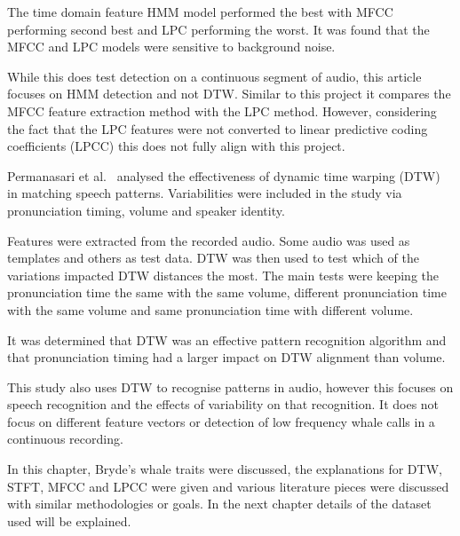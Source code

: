 The time domain feature \acs{HMM} model performed the best with \acs{MFCC} performing second best and 
\acs{LPC} performing the worst. It was found that the \acs{MFCC} and \acs{LPC} models were sensitive 
to background noise.

While this does test detection on a continuous segment of audio, this article focuses on 
\acs{HMM} detection and not \acs{DTW}. Similar to this project it compares the \acs{MFCC} feature extraction method with the \acs{LPC} method. 
However, considering the fact that the \acs{LPC} features were not converted to 
linear predictive coding coefficients (\acs{LPCC}) this does not fully align with this project.

\label{sec:speech-dtw}

Permanasari et al.~\cite{speech} analysed the effectiveness of dynamic time warping (\acs{DTW}) in 
matching speech patterns. Variabilities were included in the study via pronunciation 
timing, volume and speaker identity. 

Features were extracted from the recorded audio. Some audio was used as templates 
and others as test data. \acs{DTW} was then used to test which of the variations impacted 
\acs{DTW} distances the most. The main tests were keeping the pronunciation time 
the same with the same volume, different pronunciation time with the same volume and 
same pronunciation time with different volume. 

It was determined that \acs{DTW} was an effective pattern recognition algorithm and that 
pronunciation timing had a larger impact on \acs{DTW} alignment than volume.

This study also uses \acs{DTW} to recognise patterns in audio, however this focuses on 
speech recognition and the effects of variability on that recognition. It does not 
focus on different feature vectors or detection of low frequency whale calls in a continuous 
recording.


In this chapter, Bryde's whale traits were discussed, the explanations for \acs{DTW}, \acs{STFT}, \acs{MFCC} and \acs{LPCC} were given 
and various literature pieces were discussed with similar methodologies or goals. In the next chapter details of the dataset used will be explained.